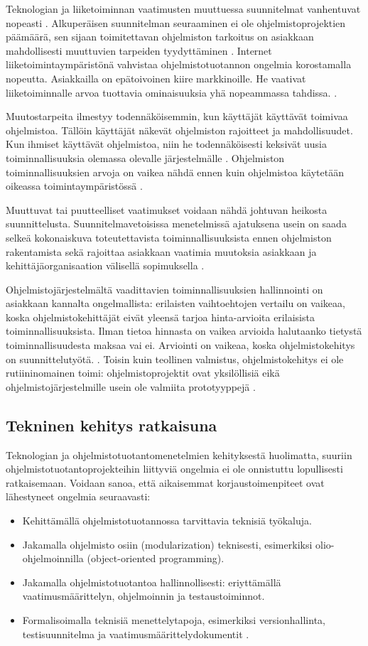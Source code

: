 \documentclass[finnish]{tktltiki2}
\theoremstyle{definition}
\theoremstyle{remark}
\begin{document}
Teknologian ja liiketoiminnan vaatimusten muuttuessa suunnitelmat vanhentuvat nopeasti \cite{WIC03}. Alkuperäisen suunnitelman seuraaminen ei ole ohjelmistoprojektien päämäärä, sen sijaan toimitettavan ohjelmiston tarkoitus on asiakkaan mahdollisesti muuttuvien tarpeiden tyydyttäminen \cite{HIC01}. Internet liiketoimintaympäristönä vahvistaa ohjelmistotuotannon ongelmia korostamalla nopeutta. Asiakkailla on epätoivoinen kiire markkinoille. He vaativat liiketoiminnalle arvoa tuottavia ominaisuuksia yhä nopeammassa tahdissa. \cite{BRL03}.

Muutostarpeita ilmestyy todennäköisemmin, kun käyttäjät käyttävät toimivaa ohjelmistoa. Tällöin käyttäjät näkevät ohjelmiston rajoitteet ja mahdollisuudet. Kun ihmiset käyttävät ohjelmistoa, niin he todennäköisesti keksivät uusia toiminnallisuuksia olemassa olevalle järjestelmälle \cite{KES95}. Ohjelmiston toiminnallisuuksien arvoja on vaikea nähdä ennen kuin ohjelmistoa käytetään oikeassa toimintaympäristössä \cite{FOW01a}.

Muuttuvat tai puutteelliset vaatimukset voidaan nähdä johtuvan heikosta suunnittelusta. Suunnitelmavetoisissa menetelmissä ajatuksena usein on saada selkeä kokonaiskuva toteutettavista toiminnallisuuksista ennen ohjelmiston rakentamista sekä rajoittaa asiakkaan vaatimia muutoksia asiakkaan ja kehittäjäorganisaation välisellä sopimuksella \cite{FOW01a}.

Ohjelmistojärjestelmältä vaadittavien toiminnallisuuksien hallinnointi on asiakkaan kannalta ongelmallista: erilaisten vaihtoehtojen vertailu on vaikeaa, koska ohjelmistokehittäjät eivät yleensä tarjoa hinta-arvioita erilaisista toiminnallisuuksista. Ilman tietoa hinnasta on vaikea arvioida halutaanko tietystä toiminnallisuudesta maksaa vai ei. Arviointi on vaikeaa, koska ohjelmistokehitys on suunnittelutyötä. \cite{FOW01a}. Toisin kuin teollinen valmistus, ohjelmistokehitys ei ole rutiininomainen toimi: ohjelmistoprojektit ovat yksilöllisiä eikä ohjelmistojärjestelmille usein ole valmiita prototyyppejä \cite{KES95}.

\subsection{Tekninen kehitys ratkaisuna}

Teknologian ja ohjelmistotuotantomenetelmien kehityksestä huolimatta, suuriin ohjelmistotuotantoprojekteihin liittyviä ongelmia ei ole onnistuttu lopullisesti ratkaisemaan.
Voidaan sanoa, että aikaisemmat korjaustoimenpiteet ovat lähestyneet ongelmia seuraavasti:
\begin{itemize}
\item Kehittämällä ohjelmistotuotannossa tarvittavia teknisiä työkaluja.
\item Jakamalla ohjelmisto osiin (modularization) teknisesti, esimerkiksi olio-ohjelmoinnilla (object-oriented programming).
\item Jakamalla ohjelmistotuotantoa hallinnollisesti: eriyttämällä vaatimus\-määrittelyn, ohjelmoinnin ja testaustoiminnot.
\item Formalisoimalla teknisiä menettelytapoja, esimerkiksi versionhallinta, testisuunnitelma ja vaatimusmäärittelydokumentit \cite{KES95}.
\end{itemize}
\end{document}

